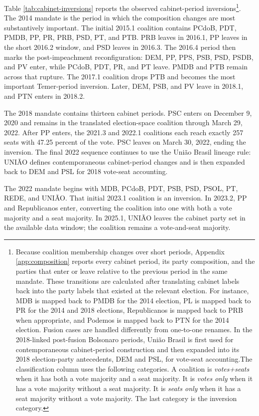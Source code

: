 \documentclass[11pt]{article}
\begin{document}
Table \ref{tab:cabinet-inversions} reports the observed cabinet-period inversions\footnote{Because
  coalition membership changes over short periods, Appendix \ref{app:composition} reports every
  cabinet period, its party composition, and the parties that enter or leave
  relative to the previous period in the same mandate. These transitions are
  calculated after translating cabinet labels back into the party labels that
  existed at the relevant election. For instance, MDB is mapped back to PMDB for
  the 2014 election, PL is mapped back to PR for the 2014 and 2018 elections,
  Republicanos is mapped back to PRB when appropriate, and Podemos is mapped
  back to PTN for the 2014 election. Fusion cases are handled differently from
  one-to-one renames. In the 2018-linked post-fusion Bolsonaro periods, União
  Brasil is first used for contemporaneous cabinet-period construction and then
  expanded into its 2018 election-party antecedents, DEM and PSL, for vote-seat
  accounting.The classification column uses the following categories. A
  coalition is \textit{votes+seats} when it has both a vote majority and a seat majority.
  It is \textit{votes only} when it has a vote majority without a seat majority. It is \textit{seats only}
  when it has a seat majority without a vote majority. The last category is the
  inversion category.}. The 2014 mandate is the period in which the composition
changes are most substantively important. The initial 2015.1 coalition contains
PCdoB, PDT, PMDB, PP, PR, PRB, PSD, PT, and PTB. PRB leaves in 2016.1, PP leaves
in the short 2016.2 window, and PSD leaves in 2016.3. The 2016.4 period then
marks the post-impeachment reconfiguration: DEM, PP, PPS, PSB, PSD, PSDB, and PV
enter, while PCdoB, PDT, PR, and PT leave. PMDB and PTB remain across that
rupture. The 2017.1 coalition drops PTB and becomes the most important
Temer-period inversion. Later, DEM, PSB, and PV leave in 2018.1, and PTN enters
in 2018.2.

The 2018 mandate contains thirteen cabinet periods. PSC enters on December 9,
2020 and remains in the translated election-space coalition through March 29,
2022. After PP enters, the 2021.3 and 2022.1 coalitions each reach exactly 257
seats with 47.25 percent of the vote. PSC leaves on March 30, 2022, ending the
inversion. The final 2022 sequence continues to use the União Brasil lineage
rule: UNIÃO defines contemporaneous cabinet-period changes and is then expanded
back to DEM and PSL for 2018 vote-seat accounting.

The 2022 mandate begins with MDB, PCdoB, PDT, PSB, PSD, PSOL, PT, REDE, and
UNIÃO. That initial 2023.1 coalition is an inversion. In 2023.2, PP and
Republicanos enter, converting the coalition into one with both a vote majority
and a seat majority. In 2025.1, UNIÃO leaves the cabinet party set in the
available data window; the coalition remains a vote-and-seat majority.
\end{document}

